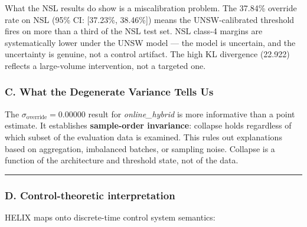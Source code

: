 \documentclass[
  conference]{IEEEtran}
\begin{document}
What the NSL results do show is a miscalibration problem. The 37.84\%
override rate on NSL (95\% CI: {[}37.23\%, 38.46\%{]}) means the
UNSW-calibrated threshold fires on more than a third of the NSL test
set. NSL class-4 margins are systematically lower under the UNSW model
--- the model is uncertain, and the uncertainty is genuine, not a
control artifact. The high KL divergence (22.922) reflects a
large-volume intervention, not a targeted one.

\subsubsection{C. What the Degenerate Variance Tells
Us}\label{c.-what-the-degenerate-variance-tells-us}

The \(\sigma_{\text{override}} = 0.00000\) result for
\emph{online\_hybrid} is more informative than a point estimate. It
establishes \textbf{sample-order invariance}: collapse holds regardless
of which subset of the evaluation data is examined. This rules out
explanations based on aggregation, imbalanced batches, or sampling
noise. Collapse is a function of the architecture and threshold state,
not of the data.

\begin{center}\rule{0.5\linewidth}{0.5pt}\end{center}

\subsubsection{D. Control-theoretic
interpretation}\label{d.-control-theoretic-interpretation}

HELIX maps onto discrete-time control system semantics:
\end{document}
